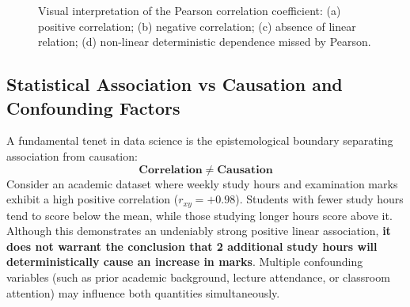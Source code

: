 \begin{figure}[H]
\vspace{0.4cm}
\begin{minipage}{0.47\textwidth}
\centering
{}
\end{minipage}%
\hfill
\begin{minipage}{0.47\textwidth}
\centering
{}
\end{minipage}
\caption{Visual interpretation of the Pearson correlation coefficient: (a) positive correlation; (b) negative correlation; (c) absence of linear relation; (d) non-linear deterministic dependence missed by Pearson.}
\label{fig:pearson-cases}
\end{figure}

\subsection{Statistical Association vs Causation and Confounding Factors}
A fundamental tenet in data science is the epistemological boundary separating association from causation:
\begin{equation}
\textbf{Correlation} \;\neq\; \textbf{Causation}
\end{equation}
Consider an academic dataset where weekly study hours and examination marks exhibit a high positive correlation ($r_{xy} = +0.98$). Students with fewer study hours tend to score below the mean, while those studying longer hours score above it. Although this demonstrates an undeniably strong positive linear association, \textbf{it does not warrant the conclusion that 2 additional study hours will deterministically cause an increase in marks}. Multiple confounding variables (such as prior academic background, lecture attendance, or classroom attention) may influence both quantities simultaneously.

